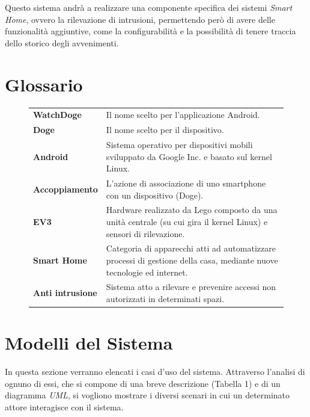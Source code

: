 \documentclass{article}
\begin{document}
    Questo sistema andrà a realizzare una componente specifica dei sistemi \textit{Smart Home}, ovvero la rilevazione di intrusioni, permettendo però di avere delle funzionalità aggiuntive, come la configurabilità e la possibilità di tenere traccia dello storico degli avvenimenti.
    
    \section{Glossario}
    
    \begin{figure}[htbp]
    \centering
    \begin{tabular}{l p{12cm}}
    \textbf{WatchDoge} & Il nome scelto per l'applicazione Android. \\
    \textbf{Doge} & Il nome scelto per il dispositivo. \\
    \textbf{Android} & Sistema operativo per dispositivi mobili sviluppato da Google Inc. e basato sul kernel Linux. \\
    \textbf{Accoppiamento} & L'azione di associazione di uno smartphone con un dispositivo (Doge). \\
    \textbf{EV3} & Hardware realizzato da Lego composto da una unità centrale (su cui gira il kernel Linux) e sensori di rilevazione. \\
    \textbf{Smart Home} & Categoria di apparecchi atti ad automatizzare processi di gestione della casa, mediante nuove tecnologie ed internet. \\
    \textbf{Anti intrusione} & Sistema atto a rilevare e prevenire accessi non autorizzati in determinati spazi. \\
    \end{tabular}
    \end{figure}
    
    \section{Modelli del Sistema}
    
    In questa sezione verranno elencati i casi d’uso del sistema.
    Attraverso l’analisi di ognuno di essi, che si compone di una breve descrizione (Tabella 1) e di un diagramma \textit{UML}, si vogliono mostrare i diversi scenari in cui un determinato attore interagisce con il sistema.
    
\end{document}
